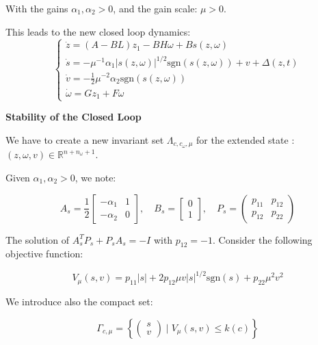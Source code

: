 With the gains \( \alpha_1, \alpha_2 > 0 \), and the gain scale: \( \mu > 0 \).

This leads to the new closed loop dynamics:
\begin{equation}
    \begin{cases}
        \dot{z} = (A - BL)z_1 - BH\omega + B s(z, \omega) \\
        \dot{s} = -\mu^{-1} \alpha_1 |s(z, \omega)|^{1/2} \text{sgn}(s(z, \omega)) + v + \Delta(z, t) \\
        \dot{v} = -\frac{1}{2} \mu^{-2} \alpha_2 \text{sgn}(s(z, \omega)) \\
        \dot{\omega} = Gz_1 + F\omega
    \end{cases}
    \label{eq:closed_loop_dynamicNiclasSTA}
\end{equation}

\textbf{Stability of the Closed Loop} 

We have to create a new invariant set \(\Lambda_{c, c_\omega, \mu}\) for the extended state :
\((z, \omega, v) \in \mathbb{R}^{n + n_\omega + 1}\).

Given \( \alpha_1, \alpha_2 > 0 \), we note:

\begin{equation}
    A_s = \frac{1}{2} \begin{bmatrix} -\alpha_1 & 1 \\ -\alpha_2 & 0 \end{bmatrix}, \quad B_s = \begin{bmatrix} 0 \\ 1 \end{bmatrix}, \quad P_s = \begin{pmatrix} p_{11} & p_{12} \\ p_{12} & p_{22} \end{pmatrix}
\end{equation}

The solution of \( A_s^T P_s + P_s A_s = -I \) with \( p_{12} = -1 \).
Consider the following objective function:

\begin{equation}
V_\mu(s, v) = p_{11} |s| + 2 p_{12} \mu v |s|^{1/2} \text{sgn}(s) + p_{22} \mu^2 v^2
\end{equation}

We introduce also the compact set:

\begin{equation}
\Gamma_{c, \mu} = \left\{ \begin{pmatrix} s \\ v \end{pmatrix} \mid V_\mu(s, v) \leq k(c) \right\}
\end{equation}

